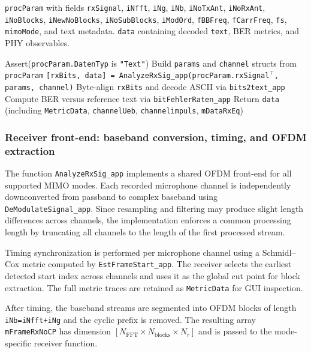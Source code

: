\begin{algorithm}[t]
\caption{End-to-end text receiver pipeline (\texttt{Signalverarbeitung\_app})}
\label{alg:rx_top}
\begin{algorithmic}[1]
\Require \texttt{procParam} with fields \texttt{rxSignal}, \texttt{iNfft}, \texttt{iNg}, \texttt{iNb}, \texttt{iNoTxAnt}, \texttt{iNoRxAnt}, \texttt{iNoBlocks}, \texttt{iNewNoBlocks}, \texttt{iNoSubBlocks}, \texttt{iModOrd}, \texttt{fBBFreq}, \texttt{fCarrFreq}, \texttt{fs}, \texttt{mimoMode}, and text metadata.
\Ensure \texttt{data} containing decoded \texttt{text}, BER metrics, and PHY observables.

\State Assert(\texttt{procParam.DatenTyp} is \texttt{"Text"})
\State Build \texttt{params} and \texttt{channel} structs from \texttt{procParam}
\State \texttt{[rxBits, data] = AnalyzeRxSig\_app(procParam.rxSignal$^\top$, params, channel)}
\State Byte-align \texttt{rxBits} and decode ASCII via \texttt{bits2text\_app}
\State Compute BER versus reference text via \texttt{bitFehlerRaten\_app}
\State Return \texttt{data} (including \texttt{MetricData}, \texttt{channelUeb}, \texttt{channelimpuls}, \texttt{mDataRxEq})
\end{algorithmic}
\end{algorithm}

\subsubsection{Receiver front-end: baseband conversion, timing, and OFDM extraction}
\label{sec:rx_frontend_final_clean}

The function \texttt{AnalyzeRxSig\_app} implements a shared OFDM front-end for all supported MIMO modes. Each recorded microphone channel is independently downconverted from passband to complex baseband using \texttt{DeModulateSignal\_app}. Since resampling and filtering may produce slight length differences across channels, the implementation enforces a common processing length by truncating all channels to the length of the first processed stream.

Timing synchronization is performed per microphone channel using a Schmidl--Cox metric computed by \texttt{EstFrameStart\_app}. The receiver selects the earliest detected start index across channels and uses it as the global cut point for block extraction. The full metric traces are retained as \texttt{MetricData} for GUI inspection.

After timing, the baseband streams are segmented into OFDM blocks of length \texttt{iNb=iNfft+iNg} and the cyclic prefix is removed. The resulting array \texttt{mFrameRxNoCP} has dimension $[N_{\mathrm{FFT}} \times N_{\mathrm{blocks}} \times N_r]$ and is passed to the mode-specific receiver function.

